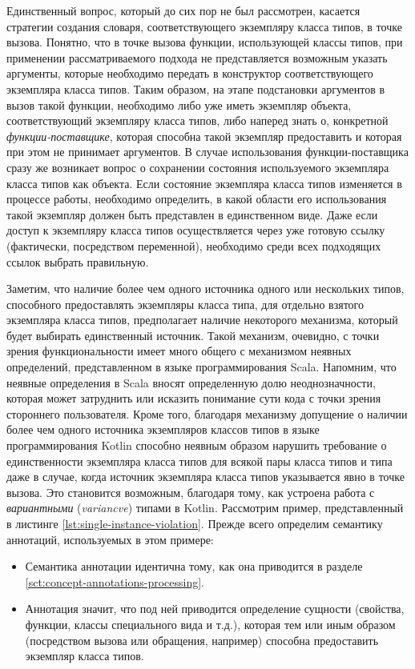 Единственный вопрос, который до сих пор не был рассмотрен, касается стратегии создания словаря, соответствующего экземпляру класса типов, в точке вызова. Понятно, что в точке вызова функции, использующей классы типов, при применении рассматриваемого подхода не представляется возможным указать аргументы, которые необходимо передать в конструктор соответствующего экземпляра класса типов. Таким образом, на этапе подстановки аргументов в вызов такой функции, необходимо либо уже иметь экземпляр объекта, соответствующий экземпляру класса типов, либо наперед знать о, конкретной \emph{функции-поставщике}, которая способна такой экземпляр предоставить и которая при этом не принимает аргументов. В случае использования функции-поставщика сразу же возникает вопрос о сохранении состояния используемого экземпляра класса типов как объекта. Если состояние экземпляра класса типов изменяется в процессе работы, необходимо определить, в какой области его использования такой экземпляр должен быть представлен в единственном виде. Даже если доступ к экземпляру класса типов осуществляется через уже готовую ссылку (фактически, посредством переменной), необходимо среди всех подходящих ссылок выбрать правильную.

Заметим, что наличие более чем одного источника одного или нескольких типов, способного предоставлять экземпляры класса типа, для отдельно взятого экземпляра класса типов, предполагает наличие некоторого механизма, который будет выбирать единственный источник. Такой механизм, очевидно, с точки зрения функциональности имеет много общего с механизмом неявных определений, представленном в языке программирования Scala. Напомним, что неявные определения в Scala вносят определенную долю неоднозначности, которая может затруднить или исказить понимание сути кода с точки зрения стороннего пользователя. Кроме того, благодаря механизму  допущение о наличии более чем одного источника экземпляров классов типов в языке программирования Kotlin способно неявным образом нарушить требование о единственности экземпляра класса типов для всякой пары класса типов и типа даже в случае, когда источник экземпляра класса типов указывается явно в точке вызова. Это становится возможным, благодаря тому, как устроена работа с \emph{вариантными} (\emph{variancve}) типами в Kotlin. Рассмотрим пример, представленный в листинге \ref{lst:single-instance-violation}. Прежде всего определим семантику аннотаций, используемых в этом примере:
\begin{itemize}
    \item Семантика аннотации  идентична тому, как она приводится в разделе \ref{sct:concept-annotations-processing}.
    \item Аннотация  значит, что под ней приводится определение сущности (свойства, функции, классы специального вида и т.д.), которая тем или иным образом (посредством вызова или обращения, например) способна предоставить экземпляр класса типов.     
\end{itemize}

